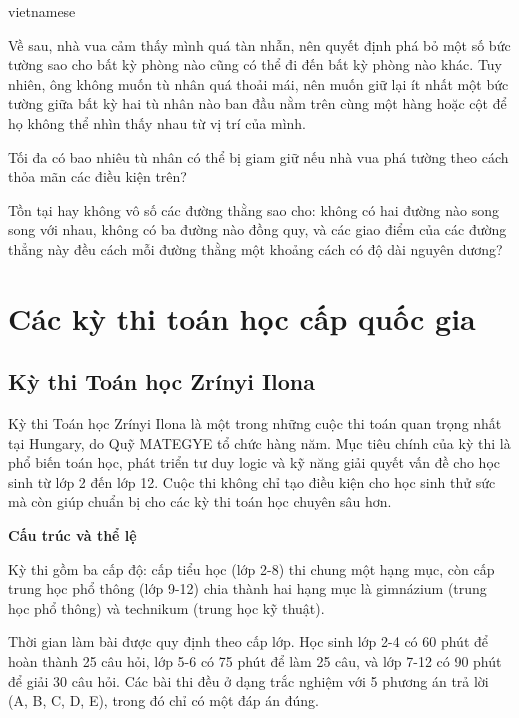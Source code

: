 \documentclass{article}
\begin{document}
\begin{otherlanguage*}{vietnamese}
\begin{problem*}
    Về sau, nhà vua cảm thấy mình quá tàn nhẫn, nên quyết định phá bỏ một số bức tường sao cho bất kỳ phòng nào cũng có thể đi đến bất kỳ phòng nào khác.
    Tuy nhiên, ông không muốn tù nhân quá thoải mái, nên muốn giữ lại ít nhất một bức tường
    giữa bất kỳ hai tù nhân nào ban đầu nằm trên cùng một hàng hoặc cột để họ không thể nhìn thấy nhau từ vị trí của mình.

    Tối đa có bao nhiêu tù nhân có thể bị giam giữ nếu nhà vua phá tường theo cách thỏa mãn các điều kiện trên?
\end{problem*}

\begin{problem*}
    Tồn tại hay không vô số các đường thằng sao cho: không có hai đường nào song song với nhau, không có ba đường nào đồng quy,
    và các giao điểm của các đường thẳng này đều cách mỗi đường thằng một khoảng cách có độ dài nguyên dương?
\end{problem*}

\newpage

\section{Các kỳ thi toán học cấp quốc gia}

\subsection{Kỳ thi Toán học Zrínyi Ilona}

Kỳ thi Toán học Zrínyi Ilona là một trong những cuộc thi toán quan trọng nhất tại Hungary, do Quỹ MATEGYE tổ chức hàng năm.
Mục tiêu chính của kỳ thi là phổ biến toán học, phát triển tư duy logic và kỹ năng giải quyết vấn đề cho học sinh từ lớp 2 đến lớp 12.
Cuộc thi không chỉ tạo điều kiện cho học sinh thử sức mà còn giúp chuẩn bị cho các kỳ thi toán học chuyên sâu hơn.

\textbf{Cấu trúc và thể lệ}

Kỳ thi gồm ba cấp độ: cấp tiểu học (lớp 2-8) thi chung một hạng mục, còn cấp trung học phổ thông (lớp 9-12) chia thành hai hạng mục là gimnázium (trung học phổ thông)
và technikum (trung học kỹ thuật).

Thời gian làm bài được quy định theo cấp lớp. Học sinh lớp 2-4 có 60 phút để hoàn thành 25 câu hỏi, lớp 5-6 có 75 phút để làm 25 câu, và lớp 7-12 có 90 phút để giải 30 câu hỏi.
Các bài thi đều ở dạng trắc nghiệm với 5 phương án trả lời (A, B, C, D, E), trong đó chỉ có một đáp án đúng.


\end{otherlanguage*}
\end{document}
